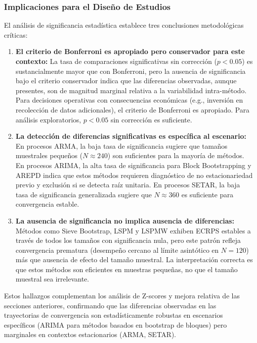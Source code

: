 \subsubsection{Implicaciones para el Diseño de Estudios}

El análisis de significancia estadística establece tres conclusiones metodológicas críticas:

\begin{enumerate}
\item \textbf{El criterio de Bonferroni es apropiado pero conservador para este contexto:} La tasa de comparaciones significativas sin corrección ($p < 0.05$) es sustancialmente mayor que con Bonferroni, pero la ausencia de significancia bajo el criterio conservador indica que las diferencias observadas, aunque presentes, son de magnitud marginal relativa a la variabilidad intra-método. Para decisiones operativas con consecuencias económicas (e.g., inversión en recolección de datos adicionales), el criterio de Bonferroni es apropiado. Para análisis exploratorios, $p < 0.05$ sin corrección es suficiente.

\item \textbf{La detección de diferencias significativas es específica al escenario:} En procesos ARMA, la baja tasa de significancia sugiere que tamaños muestrales pequeños ($N \approx 240$) son suficientes para la mayoría de métodos. En procesos ARIMA, la alta tasa de significancia para Block Bootstrapping y AREPD indica que estos métodos requieren diagnóstico de no estacionariedad previo y exclusión si se detecta raíz unitaria. En procesos SETAR, la baja tasa de significancia generalizada sugiere que $N \approx 360$ es suficiente para convergencia estable.

\item \textbf{La ausencia de significancia no implica ausencia de diferencias:} Métodos como Sieve Bootstrap, LSPM y LSPMW exhiben ECRPS estables a través de todos los tamaños con significancia nula, pero este patrón refleja convergencia prematura (desempeño cercano al límite asintótico en $N=120$) más que ausencia de efecto del tamaño muestral. La interpretación correcta es que estos métodos son eficientes en muestras pequeñas, no que el tamaño muestral sea irrelevante.
\end{enumerate}

Estos hallazgos complementan los análisis de Z-scores y mejora relativa de las secciones anteriores, confirmando que las diferencias observadas en las trayectorias de convergencia son estadísticamente robustas en escenarios específicos (ARIMA para métodos basados en bootstrap de bloques) pero marginales en contextos estacionarios (ARMA, SETAR).

